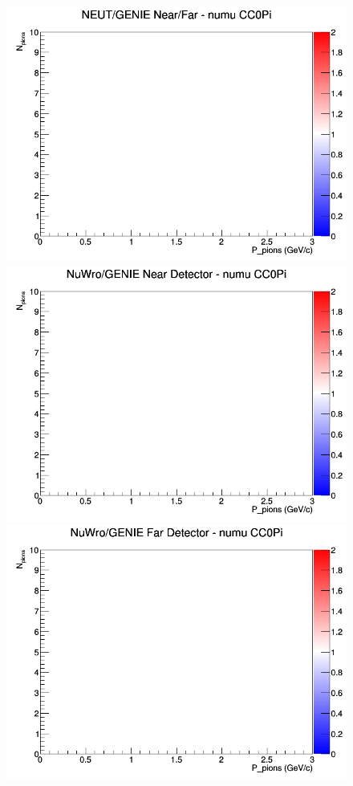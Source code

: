 \documentclass[12pt]{article}
\begin{document}
\begin{figure}[h]
\endminipage
{}
\includegraphics[width=\linewidth]{N_P/nominal/pions/ratios/CC0Pi_NEUT_GENIE_numu_NF_N_P.png}
\endminipage
\newline
{}
\includegraphics[width=\linewidth]{N_P/nominal/pions/ratios/CC0Pi_NuWro_GENIE_numu_near_N_P.png}
\endminipage
{}
\includegraphics[width=\linewidth]{N_P/nominal/pions/ratios/CC0Pi_NuWro_GENIE_numu_far_N_P.png}

\end{figure}
\end{document}
